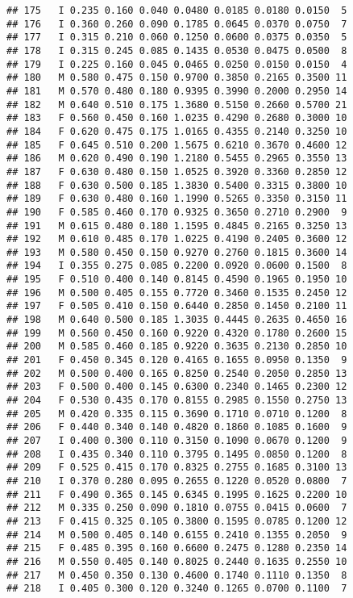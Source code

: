\documentclass[
]{article}
\begin{document}
\begin{verbatim}
## 175   I 0.235 0.160 0.040 0.0480 0.0185 0.0180 0.0150  5
## 176   I 0.360 0.260 0.090 0.1785 0.0645 0.0370 0.0750  7
## 177   I 0.315 0.210 0.060 0.1250 0.0600 0.0375 0.0350  5
## 178   I 0.315 0.245 0.085 0.1435 0.0530 0.0475 0.0500  8
## 179   I 0.225 0.160 0.045 0.0465 0.0250 0.0150 0.0150  4
## 180   M 0.580 0.475 0.150 0.9700 0.3850 0.2165 0.3500 11
## 181   M 0.570 0.480 0.180 0.9395 0.3990 0.2000 0.2950 14
## 182   M 0.640 0.510 0.175 1.3680 0.5150 0.2660 0.5700 21
## 183   F 0.560 0.450 0.160 1.0235 0.4290 0.2680 0.3000 10
## 184   F 0.620 0.475 0.175 1.0165 0.4355 0.2140 0.3250 10
## 185   F 0.645 0.510 0.200 1.5675 0.6210 0.3670 0.4600 12
## 186   M 0.620 0.490 0.190 1.2180 0.5455 0.2965 0.3550 13
## 187   F 0.630 0.480 0.150 1.0525 0.3920 0.3360 0.2850 12
## 188   F 0.630 0.500 0.185 1.3830 0.5400 0.3315 0.3800 10
## 189   F 0.630 0.480 0.160 1.1990 0.5265 0.3350 0.3150 11
## 190   F 0.585 0.460 0.170 0.9325 0.3650 0.2710 0.2900  9
## 191   M 0.615 0.480 0.180 1.1595 0.4845 0.2165 0.3250 13
## 192   M 0.610 0.485 0.170 1.0225 0.4190 0.2405 0.3600 12
## 193   M 0.580 0.450 0.150 0.9270 0.2760 0.1815 0.3600 14
## 194   I 0.355 0.275 0.085 0.2200 0.0920 0.0600 0.1500  8
## 195   F 0.510 0.400 0.140 0.8145 0.4590 0.1965 0.1950 10
## 196   M 0.500 0.405 0.155 0.7720 0.3460 0.1535 0.2450 12
## 197   F 0.505 0.410 0.150 0.6440 0.2850 0.1450 0.2100 11
## 198   M 0.640 0.500 0.185 1.3035 0.4445 0.2635 0.4650 16
## 199   M 0.560 0.450 0.160 0.9220 0.4320 0.1780 0.2600 15
## 200   M 0.585 0.460 0.185 0.9220 0.3635 0.2130 0.2850 10
## 201   F 0.450 0.345 0.120 0.4165 0.1655 0.0950 0.1350  9
## 202   M 0.500 0.400 0.165 0.8250 0.2540 0.2050 0.2850 13
## 203   F 0.500 0.400 0.145 0.6300 0.2340 0.1465 0.2300 12
## 204   F 0.530 0.435 0.170 0.8155 0.2985 0.1550 0.2750 13
## 205   M 0.420 0.335 0.115 0.3690 0.1710 0.0710 0.1200  8
## 206   F 0.440 0.340 0.140 0.4820 0.1860 0.1085 0.1600  9
## 207   I 0.400 0.300 0.110 0.3150 0.1090 0.0670 0.1200  9
## 208   I 0.435 0.340 0.110 0.3795 0.1495 0.0850 0.1200  8
## 209   F 0.525 0.415 0.170 0.8325 0.2755 0.1685 0.3100 13
## 210   I 0.370 0.280 0.095 0.2655 0.1220 0.0520 0.0800  7
## 211   F 0.490 0.365 0.145 0.6345 0.1995 0.1625 0.2200 10
## 212   M 0.335 0.250 0.090 0.1810 0.0755 0.0415 0.0600  7
## 213   F 0.415 0.325 0.105 0.3800 0.1595 0.0785 0.1200 12
## 214   M 0.500 0.405 0.140 0.6155 0.2410 0.1355 0.2050  9
## 215   F 0.485 0.395 0.160 0.6600 0.2475 0.1280 0.2350 14
## 216   M 0.550 0.405 0.140 0.8025 0.2440 0.1635 0.2550 10
## 217   M 0.450 0.350 0.130 0.4600 0.1740 0.1110 0.1350  8
## 218   I 0.405 0.300 0.120 0.3240 0.1265 0.0700 0.1100  7

\end{verbatim}
\end{document}
